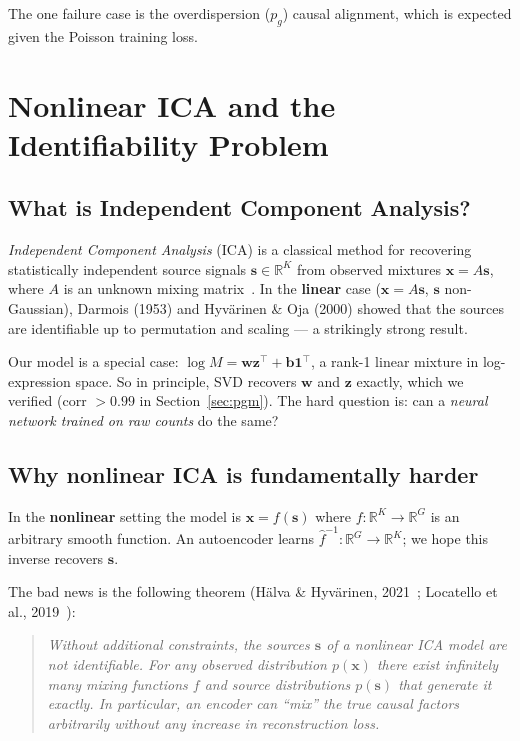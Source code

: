 \documentclass[11pt,a4paper]{article}
\newcommand{\R}{\mathbb{R}}
\theoremstyle{definition}
\begin{document}
\noindent The one failure case is the overdispersion ($p_g$) causal
alignment, which is expected given the Poisson training loss.

\appendix
\section{Nonlinear ICA and the Identifiability Problem}
\label{sec:nica}

\subsection{What is Independent Component Analysis?}

\emph{Independent Component Analysis} (ICA) is a classical method for
recovering statistically independent source signals $\bm{s} \in \R^K$
from observed mixtures $\bm{x} = A\bm{s}$, where $A$ is an unknown
mixing matrix~\cite{hyvarinen2001ica}.  In the \textbf{linear} case
($\bm{x} = A\bm{s}$, $\bm{s}$ non-Gaussian), Darmois (1953) and
Hyv\"arinen \& Oja (2000) showed that the sources are identifiable up to
permutation and scaling --- a strikingly strong result.

Our model is a special case: $\log M = \bm{w}\bm{z}^\top +
\bm{b}\bm{1}^\top$, a rank-1 linear mixture in log-expression space.
So in principle, SVD recovers $\bm{w}$ and $\bm{z}$ exactly, which we
verified (corr $> 0.99$ in Section~\ref{sec:pgm}).
The hard question is: can a \emph{neural network trained on raw counts}
do the same?

\subsection{Why nonlinear ICA is fundamentally harder}

In the \textbf{nonlinear} setting the model is
$\bm{x} = f(\bm{s})$ where $f: \R^K \to \R^G$ is an arbitrary smooth
function.  An autoencoder learns $\hat{f}^{-1}: \R^G \to \R^K$; we
hope this inverse recovers $\bm{s}$.

The bad news is the following theorem (H\"alva \& Hyv\"arinen,
2021~\cite{halva2021disentanglement}; Locatello et al.,
2019~\cite{locatello2019challenging}):

\begin{quote}
\itshape
Without additional constraints, the sources $\bm{s}$ of a nonlinear ICA
model are not identifiable.  For any observed distribution $p(\bm{x})$
there exist infinitely many mixing functions $f$ and source distributions
$p(\bm{s})$ that generate it exactly.  In particular, an encoder can
``mix'' the true causal factors arbitrarily without any increase in
reconstruction loss.
\end{quote}
\end{document}
